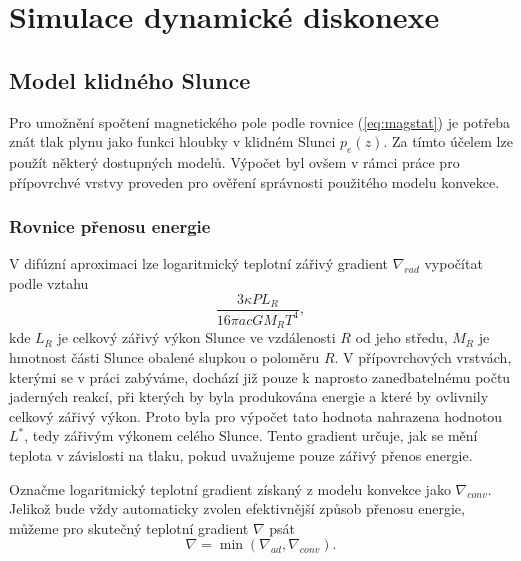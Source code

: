 \chapter{Simulace dynamické diskonexe}

\section{Model klidného Slunce}
Pro umožnění spočtení magnetického pole podle rovnice (\ref{eq:magstat}) je potřeba znát tlak plynu jako funkci hloubky v klidném Slunci $p_e(z)$. Za tímto účelem lze použít některý dostupných modelů. Výpočet byl ovšem v rámci práce pro přípovrchvé vrstvy proveden pro ověření správnosti použitého modelu konvekce.

\subsection{Rovnice přenosu energie}
V difúzní aproximaci lze logaritmický teplotní zářivý gradient $\nabla_{rad}$ vypočítat podle vztahu
\begin{equation}
	\frac{3\kappa P L_R}{16\pi a c G M_R T^4},
\end{equation}
kde $L_R$ je celkový zářivý výkon Slunce ve vzdálenosti $R$ od jeho středu, $M_R$ je hmotnost části Slunce obalené slupkou o poloměru $R$. V přípovrchových vrstvách, kterými se v práci zabýváme, dochází již pouze k naprosto zanedbatelnému počtu jaderných reakcí, při kterých by byla produkována energie a které by ovlivnily celkový zářivý výkon. Proto byla pro výpočet tato hodnota nahrazena hodnotou $L^*$, tedy zářivým výkonem celého Slunce. Tento gradient určuje, jak se mění teplota v závislosti na tlaku, pokud uvažujeme pouze zářivý přenos energie.

Označme logaritmický teplotní gradient získaný z modelu konvekce jako $\nabla_{conv}$. Jelikož bude vždy automaticky zvolen efektivnější způsob přenosu energie, můžeme pro skutečný teplotní gradient $\nabla$ psát
\begin{equation}
	\nabla = \min(\nabla_{ad},\nabla_{conv}).
\end{equation}